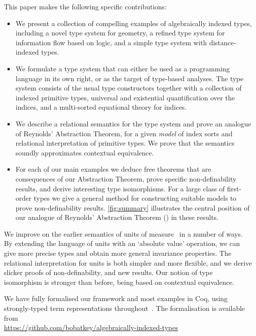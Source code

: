 This paper makes the following specific contributions:
\begin{itemize}
\item 
We present a collection of compelling examples of algebraically
indexed types, including a novel type system for geometry, a
refined type system for information flow based on logic, and a simple
type system with distance-indexed types.
\item 
We formulate a type system that can either be used as a programming
language in its own right, or as the target of type-based
analyses. The type system consists of the usual type constructors
together with a collection of indexed primitive types, universal and
existential quantification over the indices, and a multi-sorted
equational theory for indices.
\item
We describe a relational semantics for the type system and prove an
analogue of Reynolds' Abstraction Theorem, for a given \emph{model}
of index sorts and relational interpretation of primitive types.
We prove that the semantics soundly approximates contextual equivalence.
\item
For each of our main examples we deduce free theorems that are
consequences of our Abstraction Theorem, prove specific non-definability
results, and derive interesting type isomorphisms. 
For a large class of first-order types we give a general method for 
constructing suitable models to prove non-definability results. 
\autoref{fig:summary}
illustrates the central position of our analogue of Reynolds' Abstraction
Theorem () in these results.
\end{itemize}
We improve on the earlier semantics of
units of measure~\cite{kennedy97relational} in a number of ways.  By
extending the language of units with an `absolute value' operation, we
can give more precise types and obtain more general invariance
properties.  The relational interpretation for units is both simpler
and more flexible, and we derive slicker proofs of non-definability,
and new results.  Our notion of type isomorphism is stronger than
before, being based on contextual equivalence.

We have fully formalised our framework and most examples in Coq,
using strongly-typed term representations
throughout~\cite{TypedSyntax}. The formalisation is available from
\\{\small \url{https://github.com/bobatkey/algebraically-indexed-types}}
